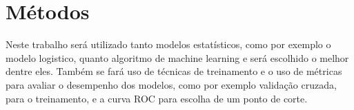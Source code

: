 \documentclass[
12pt,				%
openright,			%
oneside,			%
a4paper,			%
english,			%
brazil,				%
]{abntex2}
\begin{document}
\section{Métodos}
\label{sec:metodos}

Neste trabalho será utilizado tanto modelos estatísticos, como por exemplo o
modelo logistico, quanto algoritmo de machine learning e será escolhido o melhor
dentre eles. Também se fará uso de técnicas de treinamento e o uso de métricas
para avaliar o desempenho dos modelos, como por exemplo validação cruzada, para
o treinamento, e a curva ROC para escolha de um ponto de corte.

\end{document}
